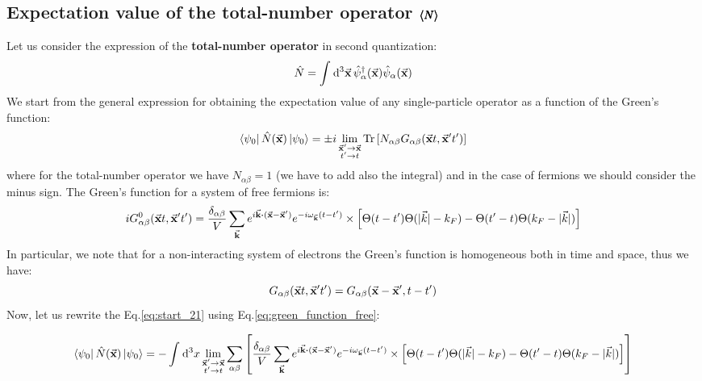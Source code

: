 \documentclass[11pt, a4paper, twoside, openright]{article}
\begin{document}
\subsection*{Expectation value of the total-number operator \( \pmb{\expval{N} } \)}
Let us consider the expression of the \textbf{total-number operator} in second quantization:
\begin{equation}
  \hat{N} =
  \int_{}^{} \dd[3]{\va{x}} \hat{\psi }_ \alpha ^\dag (\va{x}) \hat{\psi  }_ \alpha (\va{x})
\end{equation}
We start from the general expression for obtaining the expectation value of any single-particle operator as a function of the Green's function:
\begin{equation}
  \bra{\psi _0} \hat{N} (\va{x}) \ket{\psi _0}
  = \pm i
  \lim_{\substack{\va{x}' \rightarrow \va{x} \\ t' \rightarrow t } } \Tr \qty[ N_{\alpha \beta } G_{\alpha \beta }(\va{x}t,\va{x}'t')]
  \label{eq:start_21}
\end{equation}
where for the total-number operator we have \( N_{\alpha \beta }=1 \) (we have to add also the integral) and in the case of fermions we should consider the minus sign.
The Green's function for a system of free fermions is:
\begin{equation}
  i G_{\alpha \beta }^0 (\va{x}t,\va{x}'t')
  = \frac{\delta _{\alpha \beta }}{V}
  \sum_{\va{k}}^{} e^{i \va{k}\vdot (\va{x}-\va{x}')}
  e^{-i \omega _{\va{k}} (t-t')}
   \times \qty[ \Theta (t-t') \Theta (\absvec{k} -k_F) - \Theta (t'-t) \Theta (k_F- \absvec{k} )]
   \label{eq:green_function_free}
\end{equation}
In particular, we note that for a non-interacting system of electrons the Green's function is homogeneous both in time and space, thus we have:
\begin{equation*}
  G_{\alpha \beta }(\va{x}t,\va{x}'t') = G_{\alpha \beta }(\va{x} - \va{x}',t-t')
\end{equation*}
Now, let us rewrite the Eq.\eqref{eq:start_21} using Eq.\eqref{eq:green_function_free}:
\begin{small}
\begin{equation*}
\begin{split}
\bra{\psi _0} \hat{N} (\va{x}) \ket{\psi _0}   &= -
\int_{}^{} \dd[3]{x}    \lim_{\substack{\va{x}' \rightarrow \va{x} \\ t' \rightarrow t } } \sum_{\alpha \beta }^{}
\qty[
 \frac{\delta _{\alpha \beta }}{V}
\sum_{\va{k}}^{} e^{i \va{k}\vdot (\va{x}-\va{x}')}
e^{-i \omega _{\va{k}} (t-t')}
 \times \qty[ \Theta (t-t') \Theta (\absvec{k} -k_F) - \Theta (t'-t) \Theta (k_F- \absvec{k} )]
 ]
 \\
\end{split}
\end{equation*}
\end{small}
\end{document}
